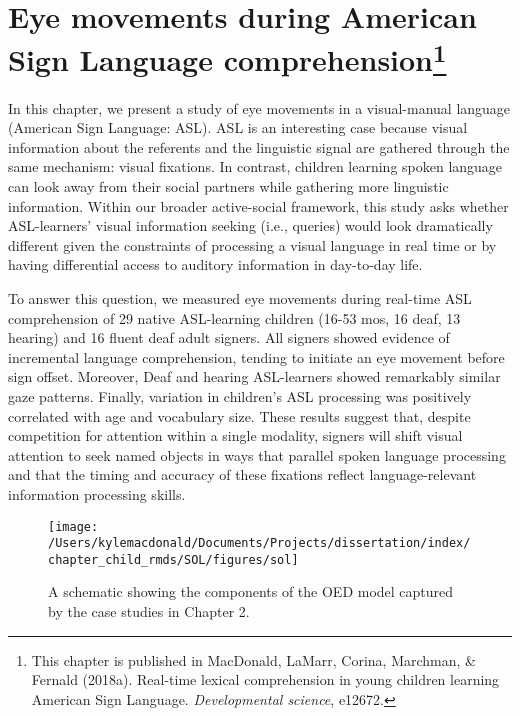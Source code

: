\documentclass[oneside]{report}
\begin{document}
\chapter[Eye movements during American Sign Language
comprehension]{\texorpdfstring{Eye movements during American Sign
Language comprehension\footnote{This chapter is published in MacDonald,
  LaMarr, Corina, Marchman, \& Fernald (2018a). Real-time lexical
  comprehension in young children learning American Sign Language.
  \emph{Developmental science}, e12672.}}{Eye movements during American Sign Language comprehension}}\label{eye-movements-during-american-sign-language-comprehension}

In this chapter, we present a study of eye movements in a visual-manual
language (American Sign Language: ASL). ASL is an interesting case
because visual information about the referents and the linguistic signal
are gathered through the same mechanism: visual fixations. In contrast,
children learning spoken language can look away from their social
partners while gathering more linguistic information. Within our broader
active-social framework, this study asks whether ASL-learners' visual
information seeking (i.e., queries) would look dramatically different
given the constraints of processing a visual language in real time or by
having differential access to auditory information in day-to-day life.

To answer this question, we measured eye movements during real-time ASL
comprehension of 29 native ASL-learning children (16-53 mos, 16 deaf, 13
hearing) and 16 fluent deaf adult signers. All signers showed evidence
of incremental language comprehension, tending to initiate an eye
movement before sign offset. Moreover, Deaf and hearing ASL-learners
showed remarkably similar gaze patterns. Finally, variation in
children's ASL processing was positively correlated with age and
vocabulary size. These results suggest that, despite competition for
attention within a single modality, signers will shift visual attention
to seek named objects in ways that parallel spoken language processing
and that the timing and accuracy of these fixations reflect
language-relevant information processing skills.
\begin{figure}[t]

{\centering \texttt{[image: /Users/kylemacdonald/Documents/Projects/dissertation/index/chapter\_child\_rmds/SOL/figures/sol]} 

}

\caption[Overview of Chapter 2.]{A schematic showing the components of the OED model captured by the case studies in Chapter 2.}\label{fig:schematic-sol}
\end{figure}
\end{document}
